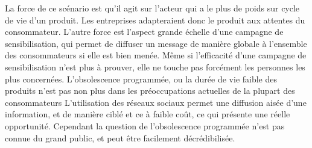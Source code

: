 \medbreak
La force de ce scénario est qu’il agit sur l’acteur qui a le plus de poids sur cycle de vie d’un produit. Les entreprises adapteraient donc le produit aux attentes du consommateur. L’autre force est l’aspect grande échelle d’une campagne de sensibilisation, qui permet de diffuser un message de manière globale à l’ensemble des consommateurs si elle est bien menée.
\medbreak
Même si l’efficacité d’une campagne de sensibilisation n’est plus à prouver, elle ne touche pas forcément les personnes les plus concernées. L'obsolescence programmée, ou la durée de vie faible des produits n’est pas non plus dans les préoccupations actuelles de la plupart des consommateurs
\medbreak
L’utilisation des réseaux sociaux permet une diffusion aisée d’une information, et de manière ciblé et ce à faible coût, ce qui présente une réelle opportunité.
\medbreak
Cependant la question de l’obsolescence programmée n’est pas connue du grand public, et peut être facilement décrédibilisée.
